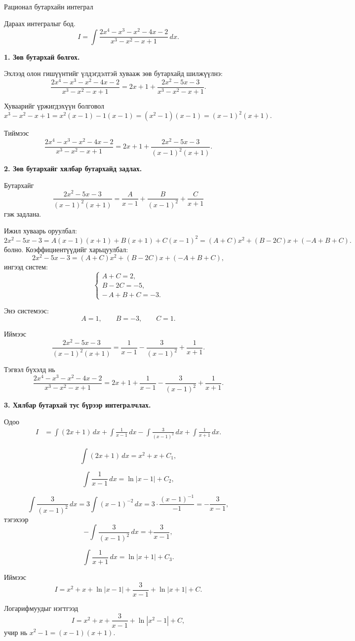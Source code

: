 \begin{frame}[allowframebreaks]{Рационал бутархайн интеграл}
\begin{example}
Дараах интегралыг бод.
\[
I=\int\dfrac{2x^4 - x^3 - x^2 - 4x - 2}{x^3-x^2-x+1}\, dx.
\]

\textbf{1. Зөв бутархай болгох.}

Эхлээд олон гишүүнтийг үлдэгдэлтэй  хувааж зөв бутархайд шилжүүлнэ:
\[
\frac{2x^4 - x^3 - x^2 - 4x - 2}{x^3 - x^2 - x + 1}
= 2x+1 + \frac{2x^2 - 5x - 3}{x^3 - x^2 - x + 1}.
\]

Хуваарийг үржигдэхүүн болговол
\[
x^3 - x^2 - x + 1 
= x^2(x-1) -1(x-1)
= (x^2-1)(x-1)
= (x-1)^2(x+1).
\]

Тиймээс
\[
\frac{2x^4 - x^3 - x^2 - 4x - 2}{x^3 - x^2 - x + 1}
= 2x+1 + \frac{2x^2 - 5x - 3}{(x-1)^2(x+1)}.
\]


\textbf{2. Зөв бутархайг хялбар бутархайд задлах.}

Бутархайг
\[
\frac{2x^2 - 5x - 3}{(x-1)^2(x+1)}
= \frac{A}{x-1} + \frac{B}{(x-1)^2} + \frac{C}{x+1}
\]
гэж задлана.

Ижил хуваарь оруулбал:
\[
2x^2 - 5x - 3 
= A(x-1)(x+1) + B(x+1) + C(x-1)^2
= (A+C)x^2 + (B-2C)x + (-A+B+C).
\]
болно.
Коэффициентүүдийг харьцуулбал:
\[
2x^2 - 5x - 3 = (A+C)x^2 + (B-2C)x + (-A+B+C),
\]
ингээд систем:
\[
\begin{cases}
A + C = 2,\\
B - 2C = -5,\\
-\,A + B + C = -3.
\end{cases}
\]

Энэ системээс:
\[
A = 1,\qquad B = -3,\qquad C = 1.
\]

Иймээс
\[
\frac{2x^2 - 5x - 3}{(x-1)^2(x+1)}
= \frac{1}{x-1} - \frac{3}{(x-1)^2} + \frac{1}{x+1}.
\]

Тэгвэл бүхэлд нь
\[
\dfrac{2x^4 - x^3 - x^2 - 4x - 2}{x^3 - x^2 - x + 1}
= 2x+1 + \frac{1}{x-1} - \frac{3}{(x-1)^2} + \frac{1}{x+1}.
\]

\textbf{3. Хялбар бутархай тус бүрээр интегралчлах.}

Одоо
\[
\begin{aligned}
I
&= \int (2x+1)\,dx 
+ \int \frac{1}{x-1}\,dx 
- \int \frac{3}{(x-1)^2}\,dx 
+ \int\frac{1}{x+1}\,dx.
\end{aligned}
\]

\[
\int (2x+1)\,dx = x^2 + x + C_1,
\]

\[
\int\frac{1}{x-1}\,dx = \ln|x-1| + C_2,
\]

\[
\int \frac{3}{(x-1)^2}\,dx 
= 3\int (x-1)^{-2}\,dx 
= 3\cdot\frac{(x-1)^{-1}}{-1} 
= -\frac{3}{x-1},
\]
тэгэхээр
\[
-\int \frac{3}{(x-1)^2}\,dx = +\frac{3}{x-1},
\]

\[
\int\frac{1}{x+1}\,dx = \ln|x+1| + C_3.
\]

Иймээс
\[
I
= x^2 + x + \ln|x-1| + \frac{3}{x-1} + \ln|x+1| + C.
\]

Логарифмуудыг нэгтгээд
\[
I
= x^2 + x + \frac{3}{x-1} + \ln|x^2-1| + C,
\]
учир нь $x^2-1=(x-1)(x+1)$.

\end{example}
\end{frame}


